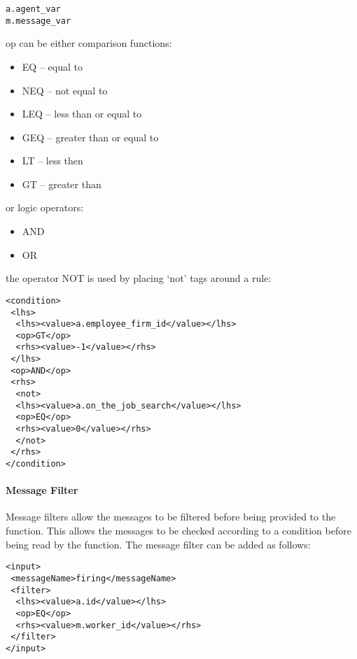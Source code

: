 \begin{mylisting}
\begin{verbatim}
a.agent_var
m.message_var
\end{verbatim}
\end{mylisting}

op can be either comparison functions:

\begin{itemize}
\item EQ -- equal to
\item NEQ -- not equal to
\item LEQ -- less than or equal to
\item GEQ -- greater than or equal to
\item LT -- less then
\item GT -- greater than
\end{itemize}
or logic operators:
\begin{itemize}
\item AND
\item OR
\end{itemize}
the operator NOT is used by placing `not' tags around a rule:
\begin{mylisting}
\begin{verbatim}
<condition>
 <lhs>
  <lhs><value>a.employee_firm_id</value></lhs>
  <op>GT</op>
  <rhs><value>-1</value></rhs>
 </lhs>
 <op>AND</op>
 <rhs>
  <not>
  <lhs><value>a.on_the_job_search</value></lhs>
  <op>EQ</op>
  <rhs><value>0</value></rhs>
  </not>
 </rhs>
</condition>
\end{verbatim}
\end{mylisting}

\paragraph{Message Filter}
Message filters allow the messages to be filtered before being
provided to the function. This allows the messages to be checked
according to a condition before being read by the function. The
message filter can be added as follows:

\begin{mylisting}
\begin{verbatim}
<input>
 <messageName>firing</messageName>
 <filter>
  <lhs><value>a.id</value></lhs>
  <op>EQ</op>
  <rhs><value>m.worker_id</value></rhs>
 </filter>
</input>
\end{verbatim}
\end{mylisting}

